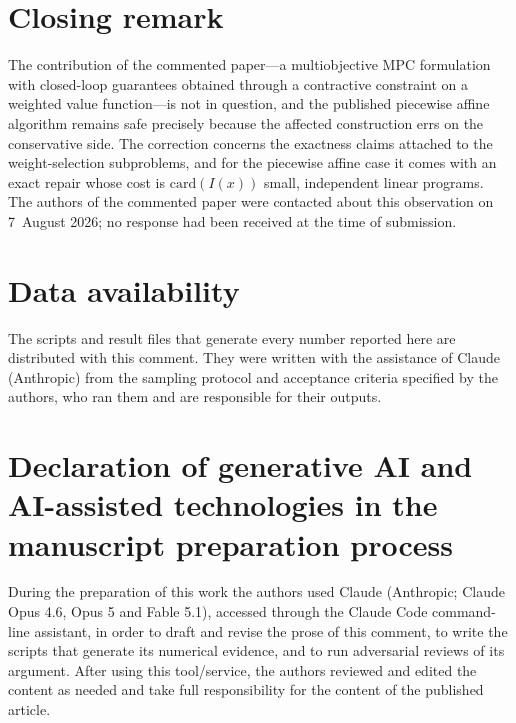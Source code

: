 \documentclass[review]{elsarticle}
\begin{document}
\section*{Closing remark}
The contribution of the commented paper---a multiobjective MPC formulation
with closed-loop guarantees obtained through a contractive constraint on a
weighted value function---is not in question, and the published piecewise
affine algorithm remains safe precisely because the affected construction errs
on the conservative side. The correction concerns the exactness claims
attached to the weight-selection subproblems, and for the piecewise affine
case it comes with an exact repair whose cost is $\mathrm{card}(I(x))$ small,
independent linear programs. The authors of the commented paper
were contacted about this observation on 7~August 2026; no response had been
received at the time of submission.

\section*{Data availability}
The scripts and result files that generate every number reported here are
distributed with this comment. They were written with the assistance of
Claude (Anthropic) from the sampling protocol and acceptance criteria
specified by the authors, who ran them and are responsible for their
outputs.

\section*{Declaration of generative AI and AI-assisted technologies in the
manuscript preparation process}
During the preparation of this work the authors used Claude (Anthropic;
Claude Opus 4.6, Opus 5 and Fable 5.1), accessed through the Claude Code
command-line assistant, in order to draft
and revise the prose of this comment, to write the scripts that generate
its numerical evidence, and to run adversarial reviews of its argument.
After using this tool/service, the authors reviewed and edited the content
as needed and take full responsibility for the content of the published
article.
\end{document}
